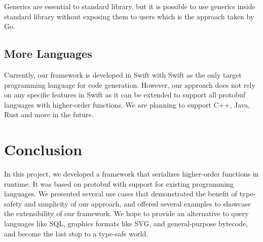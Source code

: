 \documentclass[12pt]{article}
\begin{document}
Generics are essential to standard library, but it is possible to use generics inside standard library without exposing them to users which is the approach taken by Go. \cite{go}

\subsection{More Languages}
Currently, our framework is developed in Swift with Swift as the only target programming language for code generation. However, our approach does not rely on any specific features in Swift as it can be extended to support all protobuf languages with higher-order functions. We are planning to support C++, Java, Rust and more in the future.

\section{Conclusion}
In this project, we developed a framework that serializes higher-order functions in runtime. It was based on protobuf with support for existing programming languages. We presented several use cases that demonstrated the benefit of type-safety and simplicity of our approach, and offered several examples to showcase the extensibility of our framework. We hope to provide an alternative to query languages like SQL, graphics formats like SVG, and general-purpose bytecode, and become the last stop to a type-safe world.



\end{document}
